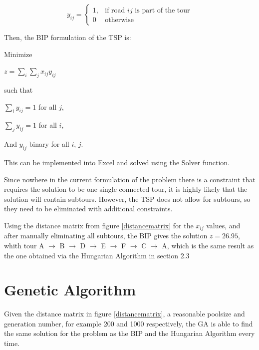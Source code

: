 \[
y_{ij}= 
\begin{cases}
1, & \text{if road $ij$ is part of the tour}\\
0 & \text{otherwise}
\end{cases}
\]
	

\vspace{5mm}
\noindent
Then, the BIP formulation of the TSP is:
\vspace{5mm}	

\noindent
Minimize

\vspace{-3mm}	
\begin{center}
$z = \sum_{i} \sum_{j} x_{ij}y_{ij}$
\end{center}	 

\noindent
such that
\vspace{-3mm}	
\begin{center}
	$\sum_{i} y_{ij}=1$ for all $j$,
	
	$\sum_{j} y_{ij}=1$ for all $i$,
	
	And $y_{ij}$ binary for all $i$, $j$.
\end{center}	
	
	
This can be implemented into Excel and solved using the Solver function.
\vspace{5mm}

Since nowhere in the current formulation of the problem there is a constraint that requires the solution to be one single connected tour, it is highly likely that the solution will contain subtours. However, the TSP does not allow for subtours, so they need to be eliminated with additional constraints.
\vspace{5mm}

Using the distance matrix from figure \ref{distancematrix} for the $x_{ij}$ values, and after manually eliminating all subtours, the BIP gives the solution $z=26.95$, whith tour A $\rightarrow$ B $\rightarrow$ D $\rightarrow$ E $\rightarrow$ F $\rightarrow$ C $\rightarrow$ A, which is the same result as the one obtained via the Hungarian Algorithm in section 2.3
	
	
	
	
\section{Genetic Algorithm}	
	
Given the distance matrix in figure \ref{distancematrix}, a reasonable poolsize and generation number, for example 200 and 1000 respectively, the GA is able to find the same solution for the problem as the BIP and the Hungarian Algorithm every time.




